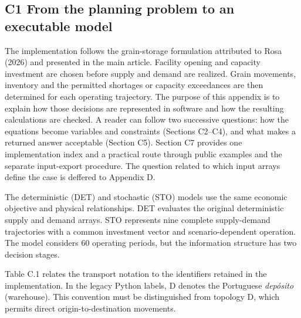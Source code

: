 \documentclass[
  english,
  11pt,
  a4paper,
]{article}
\begin{document}
\subsection{C1 From the planning problem to an executable
model}\label{c1-from-the-planning-problem-to-an-executable-model}

The implementation follows the grain-storage formulation attributed to Rosa (2026) and presented in the main article. Facility opening and
capacity investment are chosen before supply and demand are realized.
Grain movements, inventory and the permitted shortages or capacity exceedances are then determined for each operating trajectory. The purpose of this appendix is to explain how those decisions are represented in software and how the resulting calculations are checked.
A reader can follow two successive questions: how the equations become variables and constraints (Sections C2--C4), and what makes a returned answer acceptable (Section C5). Section C7 provides one implementation index and a practical route through public examples and the separate input-export procedure. The question related to which input arrays define the case is deffered to Appendix D.

The deterministic (DET) and stochastic (STO) models use the same economic objective and physical relationships. DET evaluates the original deterministic supply and demand arrays. STO represents nine complete supply-demand trajectories with a common investment vector and
scenario-dependent operation. The model considers 60 operating periods, but the information structure has two
decision stages.

Table C.1 relates the transport notation to the identifiers retained in the implementation. In the legacy Python labels, D denotes the
Portuguese \emph{depósito} (warehouse). This convention must be distinguished from topology D, which permits direct origin-to-destination movements.
\end{document}
